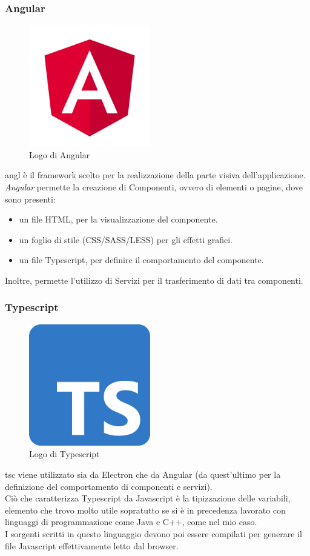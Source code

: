 \subsubsection{Angular}
\label{subsec:angular}
\begin{figure}[h]
    \centering
    \includegraphics[width=150pt]{images/technologies/angular.png}
    \caption{Logo di Angular}
    \label{fig:angular}
\end{figure}
\gls{angl} è il framework scelto per la realizzazione della parte visiva dell'applicazione.\\
\emph{Angular} permette la creazione di Componenti, ovvero di elementi o pagine, dove sono presenti:
\begin{itemize}
    \item un file HTML, per la visualizzazione del componente.
    \item un foglio di stile (CSS/SASS/LESS) per gli effetti grafici.
    \item un file Typescript, per definire il comportamento del componente.
\end{itemize}
Inoltre, permette l'utilizzo di Servizi per il trasferimento di dati tra componenti.
\subsubsection{Typescript}
\begin{figure}[h]
    \centering
    \includegraphics[width=150pt]{images/technologies/typescript.png}
    \caption{Logo di Typescript}
    \label{fig:typescript}
\end{figure}
\gls{tsc} viene utilizzato sia da Electron che da Angular (da quest'ultimo per la definizione del comportamento di componenti e servizi).\\
Ciò che caratterizza Typescript da Javascript è la tipizzazione delle variabili, elemento che trovo molto utile sopratutto se si è in precedenza lavorato con linguaggi di programmazione come Java e C++, come nel mio caso.\\
I sorgenti scritti in questo linguaggio devono poi essere compilati per generare il file Javascript effettivamente letto dal browser.

